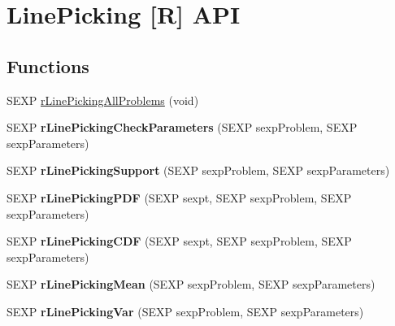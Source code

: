 \hypertarget{group__rapi}{\section{Line\-Picking \mbox{[}R\mbox{]} A\-P\-I}
\label{group__rapi}
}
\subsection*{Functions}
\begin{DoxyCompactItemize}
\item 
S\-E\-X\-P \hyperlink{group__rapi_ga02145a395d24bbe929ffa57688c72ef5}{r\-Line\-Picking\-All\-Problems} (void)
\item 
\hypertarget{group__rapi_ga9b3ba58aca598b6ee8f7239e87f3076c}{S\-E\-X\-P {\bfseries r\-Line\-Picking\-Check\-Parameters} (S\-E\-X\-P sexp\-Problem, S\-E\-X\-P sexp\-Parameters)}\label{group__rapi_ga9b3ba58aca598b6ee8f7239e87f3076c}

\item 
\hypertarget{group__rapi_ga6b30fc1bdbca2a3cc7f5340f1d8b44d5}{S\-E\-X\-P {\bfseries r\-Line\-Picking\-Support} (S\-E\-X\-P sexp\-Problem, S\-E\-X\-P sexp\-Parameters)}\label{group__rapi_ga6b30fc1bdbca2a3cc7f5340f1d8b44d5}

\item 
\hypertarget{group__rapi_gafe4502dd2e61ac946bfe6543fb38dd39}{S\-E\-X\-P {\bfseries r\-Line\-Picking\-P\-D\-F} (S\-E\-X\-P sexpt, S\-E\-X\-P sexp\-Problem, S\-E\-X\-P sexp\-Parameters)}\label{group__rapi_gafe4502dd2e61ac946bfe6543fb38dd39}

\item 
\hypertarget{group__rapi_gac85aaf9284a29359e0d534ac1641b3f2}{S\-E\-X\-P {\bfseries r\-Line\-Picking\-C\-D\-F} (S\-E\-X\-P sexpt, S\-E\-X\-P sexp\-Problem, S\-E\-X\-P sexp\-Parameters)}\label{group__rapi_gac85aaf9284a29359e0d534ac1641b3f2}

\item 
\hypertarget{group__rapi_ga4316d34063551a4121f4cc0b7959b166}{S\-E\-X\-P {\bfseries r\-Line\-Picking\-Mean} (S\-E\-X\-P sexp\-Problem, S\-E\-X\-P sexp\-Parameters)}\label{group__rapi_ga4316d34063551a4121f4cc0b7959b166}

\item 
\hypertarget{group__rapi_gac2d2e36336e7c32427a9e99ccc67d18e}{S\-E\-X\-P {\bfseries r\-Line\-Picking\-Var} (S\-E\-X\-P sexp\-Problem, S\-E\-X\-P sexp\-Parameters)}\label{group__rapi_gac2d2e36336e7c32427a9e99ccc67d18e}


\end{DoxyCompactItemize}
